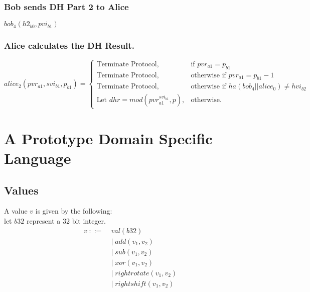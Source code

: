 \documentclass[11pt]{article}
\begin{document}
  \subsubsection{Bob sends DH Part 2 to Alice}
  $bob_4(h2_{b0},pvi_{b1})$

  \subsubsection{Alice calculates the DH Result.}
  \[
    alice_2(pvr_{a1},svi_{b1},p_{b1})=
    \begin{cases}
      \text{Terminate Protocol}, &\text{if } pvr_{a1} = p_{b1} \\
      \text{Terminate Protocol}, &\text{otherwise if } pvr_{a1} = 
            p_{b1} - 1 \\
      \text{Terminate Protocol}, &\text{otherwise if } 
            ha(bob_4||alice_0) \neq hvi_{b2} \\
      \text{Let $dhr = mod(pvr_{a1}^{svi_{b1}},p)$}, 
            &\text{otherwise.} 
    \end{cases}
  \]

  \section{A Prototype Domain Specific Language}
  \subsection{Values}
  A value $v$ is given by the following: \\
  let $b32$ represent a 32 bit integer. \\
  \begin{align*}
  v\; ::=\; &val(b32) \\
          &|\; add(v_1,v_2) \\
          &|\; sub(v_1,v_2) \\
          &|\; xor(v_1,v_2) \\
          &|\; rightrotate(v_1,v_2) \\
          &|\; rightshift(v_1,v_2)
  \end{align*}
\end{document}
